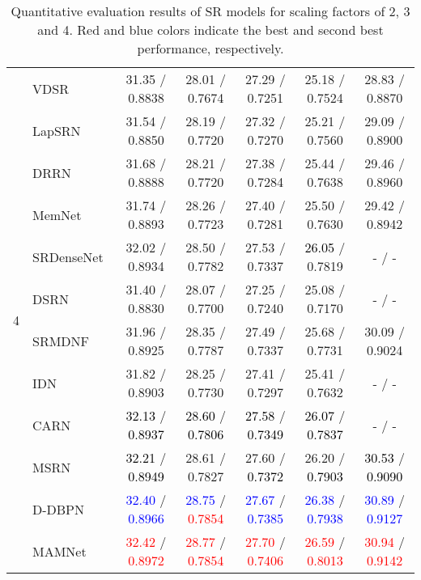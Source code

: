 \documentclass[final,5p,times,twocolumn]{elsarticle}
\begin{document}
\begin{table*}[t]
{\begin{tabular}{clccccc}
			\multirow{12}{*}{4} & VDSR \cite{kim2016accurate}  & 31.35 / 0.8838 & 28.01 / 0.7674 & 27.29 / 0.7251 & 25.18 / 0.7524 & 28.83 / 0.8870\\
			& LapSRN \cite{lai2017laplacian} & 31.54 / 0.8850 & 28.19 / 0.7720 & 27.32 / 0.7270 & 25.21 / 0.7560 &29.09 / 0.8900 \\
			& DRRN \cite{tai2017image} & 31.68 / 0.8888 & 28.21 / 0.7720 & 27.38 / 0.7284 & 25.44 / 0.7638 & 29.46 / 0.8960\\
			& MemNet \cite{tai2017memnet}  & 31.74 / 0.8893 & 28.26 / 0.7723 & 27.40 / 0.7281 & 25.50 / 0.7630 & 29.42 / 0.8942 \\
			& SRDenseNet~\cite{tong2017image}  & 32.02 / 0.8934 & 28.50 / 0.7782 & 27.53 / 0.7337 & \textcolor{black}{26.05} / 0.7819 & - / -\\
			& DSRN \cite{han2018image}  & 31.40 / 0.8830 & 28.07 / 0.7700 & 27.25 / 0.7240 & 25.08 / 0.7170 & - / -\\
			& SRMDNF \cite{zhang2018learning}  & 31.96 / 0.8925 & 28.35 / 0.7787 & 27.49 / 0.7337 & 25.68 / 0.7731 & 30.09 / 0.9024 \\			
			& IDN \cite{hui2018fast}  & 31.82 / 0.8903 & 28.25 / 0.7730 & 27.41 / 0.7297 & 25.41 / 0.7632 & - / -\\
			& CARN \cite{ahn2018fast}  & \textcolor{black}{32.13} / \textcolor{black}{0.8937} & \textcolor{black}{28.60} / \textcolor{black}{0.7806} & \textcolor{black}{27.58} / \textcolor{black}{0.7349} & \textcolor{black}{26.07} / \textcolor{black}{0.7837} & - / -\\
			& MSRN~\cite{li2018multi}  & \textcolor{black}{32.21} / \textcolor{black}{0.8949} & 28.61 / 0.7827 & 27.60 / \textcolor{black}{0.7372} & 26.20 / \textcolor{black}{0.7903} & \textcolor{black}{30.53} / \textcolor{black}{0.9090} \\
			& D-DBPN~\cite{haris2018deep}  & \textcolor{blue}{32.40} / \textcolor{blue}{0.8966} & \textcolor{blue}{28.75} / \textcolor{red}{0.7854} & \textcolor{blue}{27.67} / \textcolor{blue}{0.7385} & \textcolor{blue}{26.38} / \textcolor{blue}{0.7938} & \textcolor{blue}{30.89} / \textcolor{blue}{0.9127} \\
& MAMNet & \textcolor{red}{32.42} / \textcolor{red}{0.8972} & \textcolor{red}{28.77} / \textcolor{red}{0.7854} & \textcolor{red}{27.70} / \textcolor{red}{0.7406} & \textcolor{red}{26.59} / \textcolor{red}{0.8013} & \textcolor{red}{30.94} / \textcolor{red}{0.9142} \\
\bottomrule
		\end{tabular}
	}
	\caption{Quantitative evaluation results of SR models for scaling factors of 2, 3 and 4. Red and blue colors indicate the best and second best performance, respectively.}
	\label{tab:MSRN}
\end{table*}
\end{document}
